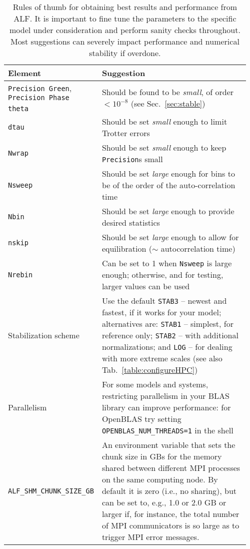 \begin{table}[h!]
	\begin{center}
		\begin{tabular}{@{} p{0.22\linewidth} p{0.74\linewidth} @{}}\toprule
			Element & Suggestion  \\ \midrule
			\texttt{Precision Green}, \texttt{Precision Phase}  &  \multirow{2}{*}{Should be found to be \emph{small}, of order $< 10^{-8}$ (see Sec.~\ref{sec:stable})}\\
			\texttt{theta}       & Should be \emph{large} enough to guarantee convergence to ground state \\
			\texttt{dtau}        & Should be set \emph{small} enough to limit Trotter errors\\
			\texttt{Nwrap}       & Should be set \emph{small} enough to keep \texttt{Precision}s small\\
			\texttt{Nsweep}      & Should be set \emph{large} enough for bins to be of the order of the auto-correlation time\\
			\texttt{Nbin}        & Should be set \emph{large} enough to provide desired statistics \\
			\texttt{nskip}       & Should be set \emph{large} enough to allow for equilibration ($\sim$ autocorrelation time) \\
			\texttt{Nrebin}      & Can be set to 1 when \texttt{Nsweep} is large enough; otherwise, and for testing, larger values can be used\\
			Stabilization scheme & Use the default \texttt{STAB3} -- newest and fastest, if it works for your model; alternatives are: \texttt{STAB1} -- simplest, for reference only; \texttt{STAB2} -- with additional normalizations; and \texttt{LOG} -- for dealing with more extreme scales (see also Tab.~\ref{table:configureHPC}) \\
			Parallelism          & For some models and systems, restricting parallelism in your BLAS library can improve performance: for OpenBLAS try setting \texttt{OPENBLAS\_NUM\_THREADS=1} in the shell \\
			\texttt{ALF\_SHM\_CHUNK\_SIZE\_GB} & An environment variable that sets the chunk size in GBs for the memory shared between different MPI processes on the same computing node. By default it is zero (i.e., no sharing), but can be set to, e.g., 1.0 or 2.0 GB or larger if, for instance, the total number of MPI communicators is so large as to trigger MPI error messages. \\\bottomrule
		\end{tabular}
		\caption{Rules of thumb for obtaining best results and performance from ALF. It is important to fine tune the parameters to the specific model under consideration and perform sanity checks throughout. Most suggestions can severely impact performance and numerical stability if overdone. \label{table:tips}}
	\end{center}
\end{table}


